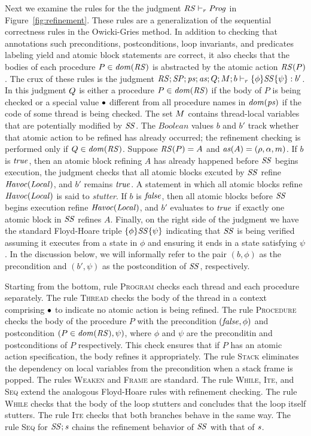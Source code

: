 Next we examine the rules for the the judgment $\mathit{RS} \vdash_r \mathit{Prog}$ in Figure~\ref{fig:refinement}.
These rules are a generalization of the sequential correctness rules in the Owicki-Gries method.
In addition to checking that annotations such preconditions, postconditions, loop invariants, 
and predicates labeling yield and atomic block statements are correct, it also checks that the bodies
of each procedure $P \in \mathit{dom}(\mathit{RS})$ is abstracted by the atomic action $\mathit{RS}(P)$.
The crux of these rules is the judgment $\mathit{RS};\mathit{SP};\mathit{ps};\mathit{as};Q;M;b \vdash_r \{\phi\} \mathit{SS} \{\psi\} : b'$.
In this judgment $Q$ is either a procedure $P \in \mathit{dom}(\mathit{RS})$ if the body of $P$ is being checked
or a special value $\bullet$ different from all procedure names in $\mathit{dom}(\mathit{ps})$ if the code of some thread 
is being checked.
The set $M$ contains thread-local variables that are potentially modified by $\mathit{SS}$.
The $\mathit{Boolean}$ values $b$ and $b'$ track whether that atomic action to be refined has already occurred;
the refinement checking is performed only if $Q \in \mathit{dom}(\mathit{RS})$.
Suppose $\mathit{RS}(P) = A$ and $\mathit{as}(A) = (\rho, \alpha, m)$.
If $b$ is $\mathit{true}$, then an atomic block refining $A$ has already happened before $\mathit{SS}$ begins execution, 
the judgment checks that all atomic blocks excuted by $\mathit{SS}$ refine $\mathit{Havoc}(\mathit{Local})$, and $b'$ remains $\mathit{true}$.
A statement in which all atomic blocks refine $\mathit{Havoc}(\mathit{Local})$ is said to {\em stutter}.
If $b$ is $\mathit{false}$, then all atomic blocks before $\mathit{SS}$ begins execution refine $\mathit{Havoc}(\mathit{Local})$,
and $b'$ evaluates to $\mathit{true}$ if exactly one atomic block in $\mathit{SS}$ refines $A$.
Finally, on the right side of the judgment we have the standard Floyd-Hoare triple $\{\phi\} \mathit{SS} \{\psi\}$ 
indicating that $\mathit{SS}$ is being verified assuming it executes from a state in $\phi$ and ensuring it ends in a state satisfying $\psi$.
In the discussion below, we will informally refer to the pair $(b,\phi)$ as the precondition and $(b',\psi)$
as the postcondition of $\mathit{SS}$, respectively.

Starting from the bottom, rule \textsc{Program} checks each thread and each procedure separately.
The rule \textsc{Thread} checks the body of the thread in a context comprising $\bullet$ to indicate 
no atomic action is being refined.
The rule \textsc{Procedure} checks the body of the procedure $P$ with
the precondition $(\mathit{false},\phi)$ and postcondition $(P \in \mathit{dom}(\mathit{RS}),\psi)$,
where $\phi$ and $\psi$ are the preconditin and postconditions of $P$ respectively.
This check ensures that if $P$ has an atomic action specification, the body refines it appropriately.
The rule \textsc{Stack} eliminates the dependency on local variables from the precondition when a stack frame is popped.
The rules \textsc{Weaken} and \textsc{Frame} are standard.
The rule \textsc{While}, \textsc{Ite}, and \textsc{Seq} extend the analogous Floyd-Hoare rules with refinement checking.
The rule \textsc{While} checks that the body of the loop stutters and concludes that the loop itself stutters.
The rule \textsc{Ite} checks that both branches behave in the same way.
The rule \textsc{Seq} for $\mathit{SS};\mathit{s}$ chains the refinement behavior of $\mathit{SS}$ with that of $\mathit{s}$.

